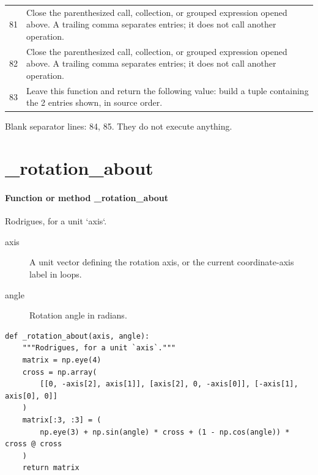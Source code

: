 \documentclass[11pt,a4paper]{book}
\begin{document}
\begin{longtable}{r p{}}
81 & Close the parenthesized call, collection, or grouped expression opened above. A trailing comma separates entries; it does not call another operation. \\

82 & Close the parenthesized call, collection, or grouped expression opened above. A trailing comma separates entries; it does not call another operation. \\

83 & Leave this function and return the following value: build a tuple containing the 2 entries shown, in source order. \\

\end{longtable}

Blank separator lines: 84, 85. They do not execute anything.

\section{\_rotation\_about}

\paragraph{Function or method \_rotation\_about}
Rodrigues, for a unit `axis`.

\begin{description}
\item[axis] A unit vector defining the rotation axis, or the current coordinate-axis label in loops.
\item[angle] Rotation angle in radians.
\end{description}

\begin{lstlisting}[firstnumber=86]
def _rotation_about(axis, angle):
    """Rodrigues, for a unit `axis`."""
    matrix = np.eye(4)
    cross = np.array(
        [[0, -axis[2], axis[1]], [axis[2], 0, -axis[0]], [-axis[1], axis[0], 0]]
    )
    matrix[:3, :3] = (
        np.eye(3) + np.sin(angle) * cross + (1 - np.cos(angle)) * cross @ cross
    )
    return matrix


\end{lstlisting}
\end{document}
